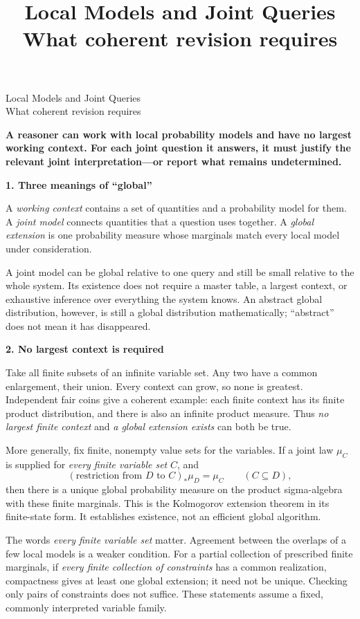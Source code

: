 \documentclass[11pt]{article}
\title{Local Models and Joint Queries\\\large What coherent revision requires}
\author{}
\date{}
\newcommand{\heading}[1]{\vspace{4pt}\textbf{#1}\par\nopagebreak}
\begin{document}
\begin{center}{\LARGE Local Models and Joint Queries}\\[3pt]{\large What coherent revision requires}\end{center}
\textbf{A reasoner can work with local probability models and have no largest
working context. For each joint question it answers, it must justify the
relevant joint interpretation---or report what remains undetermined.}

\heading{1. Three meanings of ``global''}
A \emph{working context} contains a set of quantities and a probability model
for them. A \emph{joint model} connects quantities that a question uses
together. A \emph{global extension} is one probability measure whose marginals
match every local model under consideration.

A joint model can be global relative to one query and still be small relative
to the whole system. Its existence does not require a master table, a largest
context, or exhaustive inference over everything the system knows. An abstract
global distribution, however, is still a global distribution mathematically;
``abstract'' does not mean it has disappeared.

\heading{2. No largest context is required}
Take all finite subsets of an infinite variable set. Any two have a common
enlargement, their union. Every context can grow, so none is greatest.
Independent fair coins give a coherent example: each finite context has its
finite product distribution, and there is also an infinite product measure.
Thus \emph{no largest finite context} and \emph{a global extension exists} can
both be true.

More generally, fix finite, nonempty value sets for the variables. If a joint
law $\mu_C$ is supplied for \emph{every finite variable set} $C$, and
\[
  (\text{restriction from }D\text{ to }C)_*\mu_D=\mu_C
  \qquad(C\subseteq D),
\]
then there is a unique global probability measure on the product
sigma-algebra with these finite marginals. This is the Kolmogorov extension
theorem in its finite-state form. It establishes existence, not an efficient
global algorithm.

The words \emph{every finite variable set} matter. Agreement between the
overlaps of a few local models is a weaker condition. For a partial collection of prescribed
finite marginals, if \emph{every finite collection of constraints}
has a common realization, compactness gives at least one global extension;
it need not be unique. Checking only pairs of constraints does not suffice.
These statements assume a fixed, commonly interpreted variable family.
\end{document}
